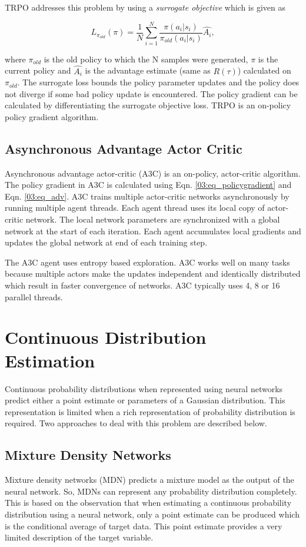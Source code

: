 TRPO addresses this problem by using a \textit{surrogate objective} which is given as 

\begin{equation}
L_{\pi_{old}}(\pi) = \dfrac{1}{N} \sum_{i=1}^N \dfrac{\pi(a_i|s_i)}{\pi_{old}(a_i|s_i)} \hat{A_i},
\end{equation}

where $\pi_{old}$ is the old policy to which the N samples were generated, $\pi$ is the current policy and $\hat{A_i}$ is the advantage estimate (same as $R(\tau)$) calculated on $\pi_{old}$. The surrogate loss bounds the policy parameter updates and the policy does not diverge if some bad policy update is encountered. The policy gradient can be calculated by differentiating the surrogate objective loss. TRPO is an on-policy policy gradient algorithm.

\subsection{Asynchronous Advantage Actor Critic}
Asynchronous advantage actor-critic (A3C) \cite{a3c} is an on-policy, actor-critic algorithm. The policy gradient in A3C is calculated using Eqn. \ref{03:eq_policygradient} and Eqn. \ref{03:eq_adv}. A3C trains multiple actor-critic networks asynchronously by running multiple agent threads. Each agent thread uses its local copy of actor-critic network. The local network parameters are synchronized with a global network at the start of each iteration. Each agent accumulates local gradients and updates the global network at end of each training step.

The A3C agent uses entropy based exploration. A3C works well on many tasks because multiple actors make the updates independent and identically distributed which result in faster convergence of networks. A3C typically uses 4, 8 or 16 parallel threads.

\newpage
\section{Continuous Distribution Estimation}
Continuous probability distributions when represented using neural networks predict either a point estimate or parameters of a Gaussian distribution. This representation is limited when a rich representation of probability distribution is required. Two approaches to deal with this problem are described below.

\subsection{Mixture Density Networks}
Mixture density networks (MDN) \cite{bishop_mdn} predicts a mixture model as the output of the neural network. So, MDNs can represent any probability distribution completely. This is based on the observation that when estimating a continuous probability distribution using a neural network, only a point estimate can be produced which is the conditional average of target data. This point estimate provides a very limited description of the target variable.

